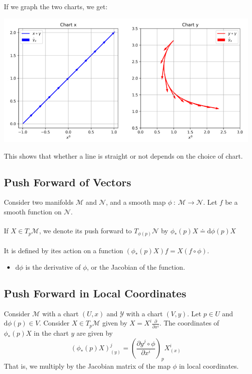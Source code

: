 \documentclass[10pt]{article}
\begin{document}
If we graph the two charts, we get:
\begin{center}
    \includegraphics[width=\textwidth]{W6_2.png}
\end{center}
This shows that whether a line is straight or not depends on the choice of chart.

\subsection*{Push Forward of Vectors}
Consider two manifolds $\mathcal{M}$ and $\mathcal{N}$, and a smooth map $\phi \::\: \mathcal{M} \rightarrow \mathcal{N}$.  Let $f$ be a smooth function on $\mathcal{N}$.\\\\
If $X \in T_p \mathcal{M}$, we denote its push forward to $T_{\phi(p)}\mathcal{N}$ by $\phi_*(p)X \doteq \text{d} \phi (p)X$\\\\
It is defined by ites action on a function $(\phi_*(p)X)f = X(f \circ \phi)$.
\begin{itemize}
    \item $\text{d}\phi$ is the derivative of $\phi$, or the Jacobian of the function.
\end{itemize}

\subsection*{Push Forward in Local Coordinates}
Consider $\mathcal{M}$ with a chart $(U, x)$ and $\mathcal{Y}$ with a chart $(V, y)$.  Let $p \in U$ and $\text{d}\phi(p) \in V$.  Consider $X \in T_p \mathcal{M}$ given by $X = X^i \frac{\partial}{\partial x^i}$.  The coordinates of $\phi_*(p)X$ in the chart $y$ are given by
\[(\phi_*(p)X)_{(y)}^j = \left(\frac{\partial y^j \circ \phi}{\partial x^i}\right)_p X^i_{(x)}\]
That is, we multiply by the Jacobian matrix of the map $\phi$ in local coordinates.
\end{document}
